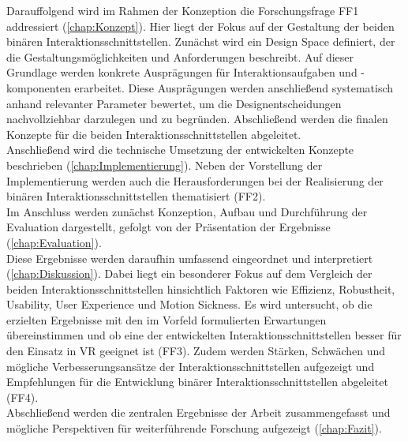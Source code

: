 Darauffolgend wird im Rahmen der Konzeption die Forschungsfrage FF1 addressiert (\autoref{chap:Konzept}). Hier liegt der Fokus auf der Gestaltung der beiden binären Interaktionsschnittstellen. Zunächst wird ein Design Space definiert, der die Gestaltungsmöglichkeiten und Anforderungen beschreibt. Auf dieser Grundlage werden konkrete Ausprägungen für Interaktionsaufgaben und -komponenten erarbeitet. Diese Ausprägungen werden anschließend systematisch anhand relevanter Parameter bewertet, um die Designentscheidungen nachvollziehbar darzulegen und zu begründen. Abschließend werden die finalen Konzepte für die beiden Interaktionsschnittstellen abgeleitet.\\
Anschließend wird die technische Umsetzung der entwickelten Konzepte beschrieben (\autoref{chap:Implementierung}). Neben der Vorstellung der Implementierung werden auch die Herausforderungen bei der Realisierung der binären Interaktionsschnittstellen thematisiert (FF2).\\
Im Anschluss werden zunächst Konzeption, Aufbau und Durchführung der Evaluation dargestellt, gefolgt von der Präsentation der Ergebnisse (\autoref{chap:Evaluation}).\\
Diese Ergebnisse werden daraufhin umfassend eingeordnet und interpretiert (\autoref{chap:Diskussion}). Dabei liegt ein besonderer Fokus auf dem Vergleich der beiden Interaktionsschnittstellen hinsichtlich Faktoren wie Effizienz, Robustheit, Usability, User Experience und Motion Sickness. Es wird untersucht, ob die erzielten Ergebnisse mit den im Vorfeld formulierten Erwartungen übereinstimmen und ob eine der entwickelten Interaktionsschnittstellen besser für den Einsatz in VR geeignet ist (FF3). Zudem werden Stärken, Schwächen und mögliche Verbesserungsansätze der Interaktionsschnittstellen aufgezeigt und Empfehlungen für die Entwicklung binärer Interaktionsschnittstellen abgeleitet (FF4). \\
Abschließend werden die zentralen Ergebnisse der Arbeit zusammengefasst und mögliche Perspektiven für weiterführende Forschung aufgezeigt (\autoref{chap:Fazit}).
